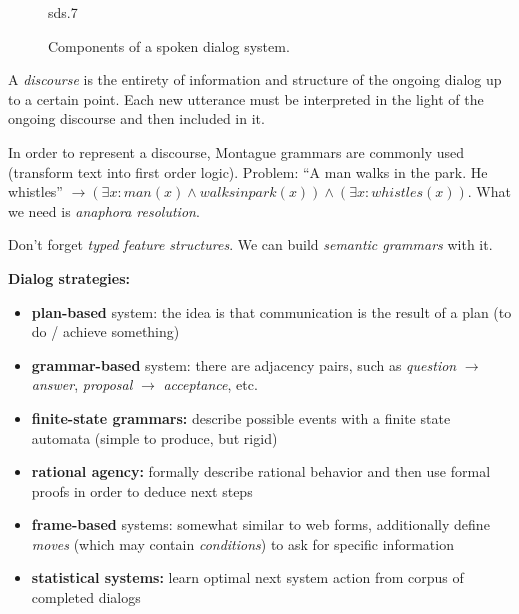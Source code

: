 \begin{figure}[htb]
    \begin{minipage}{\linewidth}
        \vspace{5cm}
        \hfill \scriptsize sds.7
    \end{minipage}
    \caption{\label{figureA} Components of a spoken dialog system.}
\end{figure}

A \textit{discourse} is the entirety of information and structure of the ongoing dialog up to a certain point. Each new utterance must be interpreted in the light of the ongoing discourse and then included in it.

\vspace{5pt}

In order to represent a discourse, Montague grammars are commonly used (transform text into first order logic). Problem: ``A man walks in the park. He whistles'' $\rightarrow (\exists x : man(x) \wedge walksinpark(x)) \wedge (\exists x : whistles(x))$. What we need is \textit{anaphora resolution}.

\vspace{5pt}

Don't forget \textit{typed feature structures}. We can build \textit{semantic grammars} with it.

\vspace{5pt}

\textbf{Dialog strategies:}
\begin{itemize}
    \item \textbf{plan-based} system: the idea is that communication is the result of a plan (to do / achieve something)
    \item \textbf{grammar-based} system: there are adjacency pairs, such as \textit{question} $\rightarrow$ \textit{answer}, \textit{proposal} $\rightarrow$ \textit{acceptance}, etc.
    \item \textbf{finite-state grammars:} describe possible events with a finite state automata (simple to produce, but rigid)
    \item \textbf{rational agency:} formally describe rational behavior and then use formal proofs in order to deduce next steps
    \item \textbf{frame-based} systems: somewhat similar to web forms, additionally define \textit{moves} (which may contain \textit{conditions}) to ask for specific information
    \item \textbf{statistical systems:} learn optimal next system action from corpus of completed dialogs
\end{itemize}

